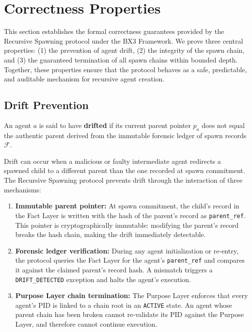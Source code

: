 \section{Correctness Properties}
\label{sec:correctness}

This section establishes the formal correctness guarantees provided by
the Recursive Spawning protocol under the BX3 Framework. We prove three
central properties: (1) the prevention of agent drift, (2) the integrity
of the spawn chain, and (3) the guaranteed termination of all spawn
chains within bounded depth. Together, these properties ensure that
the protocol behaves as a safe, predictable, and auditable mechanism
for recursive agent creation.

\subsection{Drift Prevention}
\label{sec:drift-prevention}

\begin{definition}[Drift]
An agent $a$ is said to have \textbf{drifted} if its current parent
pointer $p_a$ does not equal the authentic parent derived from the
immutable forensic ledger of spawn records $\mathcal{F}$.
\end{definition}

Drift can occur when a malicious or faulty intermediate agent redirects
a spawned child to a different parent than the one recorded at spawn
commitment. The Recursive Spawning protocol prevents drift through the
interaction of three mechanisms:

\begin{enumerate}
  \item \textbf{Immutable parent pointer:} At spawn commitment, the
        child's record in the Fact Layer is written with the hash of the
        parent's record as \texttt{parent\_ref}. This pointer is
        cryptographically immutable: modifying the parent's record breaks
        the hash chain, making the drift immediately detectable.
  \item \textbf{Forensic ledger verification:} During any agent
        initialization or re-entry, the protocol queries the Fact Layer
        for the agent's \texttt{parent\_ref} and compares it against the
        claimed parent's record hash. A mismatch triggers a
        \texttt{DRIFT\_DETECTED} exception and halts the agent's
        execution.
  \item \textbf{Purpose Layer chain termination:} The Purpose Layer
        enforces that every agent's PID is linked to a chain root in an
        \texttt{ACTIVE} state. An agent whose parent chain has been
        broken cannot re-validate its PID against the Purpose Layer,
        and therefore cannot continue execution.
\end{enumerate}

